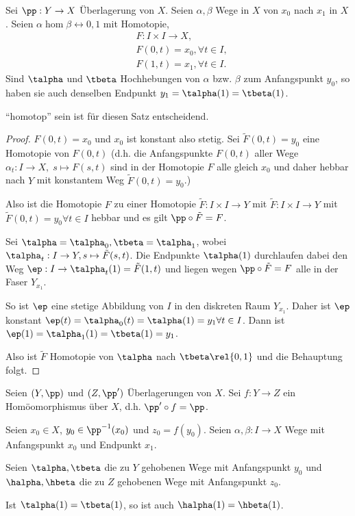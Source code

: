 \begin{prop}[Mondronomiesatz]
\label{prop:3.4.10}
Sei $\pp: Y\to X$ Überlagerung von $X$. Seien $\alpha,\beta$ Wege in $X$ von
$x_0$ nach $x_1$ in $X$. Seien $\alpha\hom\beta\rel{0,1}$ mit Homotopie,
\begin{align*}
&F: I\times I\to X,\\
&F(0,t) = x_0, \forall t\in I,\\
&F(1,t) = x_1, \forall t\in I.
\end{align*}
Sind $\talpha$ und $\tbeta$ Hochhebungen von $\alpha$ bzw. $\beta$ zum
Anfangspunkt $y_0$, so haben sie auch denselben Endpunkt $y_1=\talpha(1) =
\tbeta(1)$.\fishhere
\end{prop}
\begin{bemn}[Warnung:]
``homotop'' sein ist für diesen Satz entscheidend.
\end{bemn}

\begin{proof}
$F(0,t) = x_0$ und $x_0$ ist konstant also stetig. Sei
$\tilde{F}(0,t)=y_0$ eine Homotopie von $F(0,t)$ (d.h. die Anfangspunkte
$F(0,t)$ aller Wege $\alpha_t: I\to X,\; s\mapsto F(s,t)$ sind in der Homotopie
$F$ alle gleich $x_0$ und daher hebbar nach $Y$ mit konstantem Weg
$\tilde{F}(0,t) = y_0$.)

Also ist die Homotopie $F$ zu einer Homotopie $\tilde{F}: I\times I \to Y$ mit
$\tilde{F}: I\times I \to Y$ mit $\tilde{F}(0,t) = y_0 \forall t\in I$ hebbar
und es gilt $\pp\circ\tilde{F} = F$.

Sei $\talpha = \talpha_0, \tbeta = \talpha_1$, wobei $\talpha_t : I\to Y,
s\mapsto \tilde{F}(s,t)$. Die Endpunkte $\talpha(1)$ durchlaufen dabei den Weg
$\ep: I\to \talpha_t(1) = \tilde{F}(1,t)$ und liegen wegen $\pp\circ\tilde{F} =
F$ alle in der Faser $Y_{x_1}$.

So ist $\ep$ eine stetige Abbildung von $I$ in den diskreten Raum $Y_{x_1}$.
Daher ist $\ep$ konstant $\ep(t) = \talpha_0(t) = \talpha(1) = y_1 \forall
t\in I$. Dann ist $\ep(1) = \talpha_1(1) = \tbeta(1) = y_1$.

Also ist $\tilde{F}$ Homotopie von $\talpha$ nach $\tbeta\rel{0,1}$ und
die Behauptung folgt.\qedhere
\end{proof}

\begin{prop}[Problem]
\label{prop:3.4.11}
Seien $(Y,\pp)$ und $(Z,\pp')$ Überlagerungen von $X$. Sei $f: Y\to Z$ ein
Homöomorphismus über $X$, d.h. $\pp'\circ f = \pp$.

Seien $x_0\in X$, $y_0\in\pp^{-1}(x_0)$ und $z_0 = f(y_0)$. Seien
$\alpha,\beta: I\to X$ Wege mit Anfangspunkt $x_0$ und Endpunkt $x_1$.

Seien $\talpha,\tbeta$ die zu $Y$ gehobenen Wege mit Anfangspunkt $y_0$ und
$\halpha,\hbeta$ die zu $Z$ gehobenen Wege mit Anfangspunkt $z_0$.

Ist $\talpha(1) = \tbeta(1)$, so ist auch $\halpha(1)=\hbeta(1)$.\fishhere
\end{prop}

